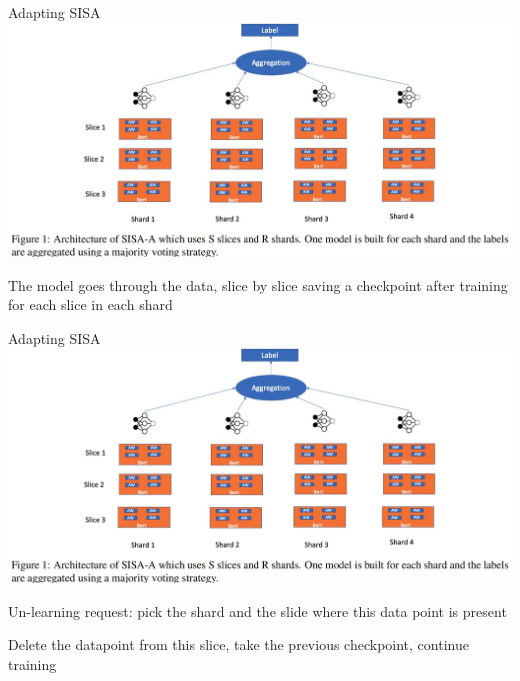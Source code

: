 \documentclass[12pt,aspectratio=169,handout]{beamer}
\begin{document}
\begin{frame}{Adapting SISA}
\includegraphics[width=\linewidth]{img/sisa-bert.jpg}


The model goes through the data, slice by slice saving a checkpoint after training for each slice in each shard


\end{frame}


\begin{frame}{Adapting SISA}
\includegraphics[width=0.7\linewidth]{img/sisa-bert.jpg}

Un-learning request: pick the shard and the slide where this data point is present

Delete the datapoint from this slice, take the previous checkpoint, continue training


\end{frame}
\end{document}
